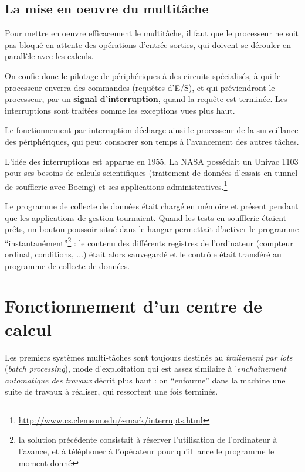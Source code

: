 \begin{multicols}{2}

\subsection{La mise en oeuvre du multitâche}

Pour mettre en oeuvre efficacement le multitâche, il faut
que le processeur ne soit pas bloqué en attente des opérations d'entrée-sorties, qui 
doivent se dérouler en parallèle avec les calculs.

On confie donc le pilotage de périphériques à des circuits
spécialisés, à qui le processeur enverra des commandes (requêtes
d'E/S), et qui préviendront le processeur, par un \textbf{signal
  d'interruption}, quand la requête est terminée.  Les interruptions
sont traitées comme les exceptions vues plus haut.

Le fonctionnement par interruption décharge ainsi le processeur de la
surveillance des périphériques, qui peut consacrer son temps à
l'avancement des autres tâches. 



L'idée des interruptions est apparue en 1955. La NASA 
possédait un
Univac 1103 pour ses besoins de calculs scientifiques (traitement de
données d'essais en tunnel de soufflerie avec Boeing) et ses
applications
administratives.\footnote{\url{http://www.cs.clemson.edu/~mark/interrupts.html}}

Le programme de collecte de données était chargé en mémoire et présent
pendant que les applications de gestion tournaient. Quand les tests en
soufflerie étaient prêts, un bouton poussoir situé dans le hangar
permettait d'activer le programme ``instantanément''\footnote{la solution précédente consistait
à réserver l'utilisation de l'ordinateur à l'avance, et à téléphoner à l'opérateur
pour qu'il lance le programme le moment donné} : le contenu des
différents registres de l'ordinateur (compteur ordinal, conditions,
...) était alors sauvegardé et le contrôle était transféré au programme de collecte 
de données. 


\section{Fonctionnement d'un centre de calcul}



Les premiers systèmes multi-tâches sont toujours destinés au
\emph{traitement par lots} (\emph{batch processing}), mode
d'exploitation qui est assez similaire à '\emph{enchaînement
  automatique des travaux} décrit plus haut : on ``enfourne'' dans la
machine une suite de travaux à réaliser, qui ressortent une fois
terminés.


\end{multicols}
